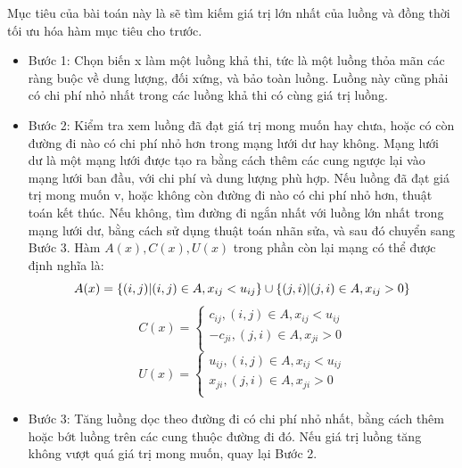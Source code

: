 \documentclass[a4paper]{article}
\begin{document}
    Mục tiêu của bài toán này là sẽ tìm kiếm giá trị lớn nhất của luồng và đồng thời tối ưu hóa hàm mục tiêu cho trước.
    \begin{itemize}
        \item Bước 1: Chọn biến x làm một luồng khả thi, tức là một luồng thỏa mãn các ràng buộc về dung lượng, đối xứng, và bảo toàn luồng. 
            Luồng này cũng phải có chi phí nhỏ nhất trong các luồng khả thi có cùng giá trị luồng.
        \item Bước 2: Kiểm tra xem luồng đã đạt giá trị mong muốn hay chưa, hoặc có còn đường đi nào có chi phí nhỏ hơn trong mạng lưới dư hay không.
            Mạng lưới dư là một mạng lưới được tạo ra bằng cách thêm các cung ngược lại vào mạng lưới ban đầu, với chi phí và dung lượng phù hợp.
            Nếu luồng đã đạt giá trị mong muốn v, hoặc không còn đường đi nào có chi phí nhỏ hơn, thuật toán kết thúc.
            Nếu không, tìm đường đi ngắn nhất với luồng lớn nhất trong mạng lưới dư, bằng cách sử dụng thuật toán nhãn sửa, và sau đó chuyển sang Bước 3.
            Hàm $A(x), C(x), U(x)$ trong phần còn lại mạng có thể được định nghĩa là:
            \begin{displaymath}
                A(x) = \{ (i,j) | (i,j) \in A, x_{ij} < u_{ij} \} \cup \{(j,i) | (j,i) \in A, x_{ij} > 0 \}\\
            \end{displaymath}
            \begin{displaymath}
                C(x)  = \begin{cases}
                    c_{ij}, (i,j) \in A, x_{ij} < u_{ij}\\
                    -c_{ji}, (j,i) \in A, x_{ji} > 0\\
                \end{cases}
            \end{displaymath}
            \begin{displaymath}
                U(x)  = \begin{cases}
                    u_{ij}, (i,j) \in A, x_{ij} < u_{ij}\\
                    x_{ji}, (j,i) \in A, x_{ji} > 0\\
                \end{cases}
            \end{displaymath}
        \item Bước 3: Tăng luồng dọc theo đường đi có chi phí nhỏ nhất, bằng cách thêm hoặc bớt luồng trên các cung thuộc đường đi đó. 
        Nếu giá trị luồng tăng không vượt quá giá trị mong muốn, quay lại Bước 2.
    \end{itemize}
\end{document}
